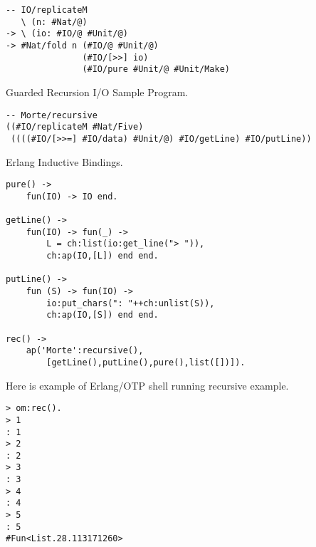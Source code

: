 \begin{lstlisting}[mathescape=true]
-- IO/replicateM
   \ (n: #Nat/@)
-> \ (io: #IO/@ #Unit/@)
-> #Nat/fold n (#IO/@ #Unit/@)
               (#IO/[>>] io)
               (#IO/pure #Unit/@ #Unit/Make)
\end{lstlisting}

Guarded Recursion I/O Sample Program.

\begin{lstlisting}[mathescape=true]
-- Morte/recursive
((#IO/replicateM #Nat/Five)
 ((((#IO/[>>=] #IO/data) #Unit/@) #IO/getLine) #IO/putLine))
\end{lstlisting}

Erlang Inductive Bindings.

\begin{lstlisting}[mathescape=true]
pure() ->
    fun(IO) -> IO end.

getLine() ->
    fun(IO) -> fun(_) ->
        L = ch:list(io:get_line("> ")),
        ch:ap(IO,[L]) end end.

putLine() ->
    fun (S) -> fun(IO) ->
        io:put_chars(": "++ch:unlist(S)),
        ch:ap(IO,[S]) end end.

rec() ->
    ap('Morte':recursive(),
        [getLine(),putLine(),pure(),list([])]).
\end{lstlisting}


Here is example of Erlang/OTP shell running recursive example.

\begin{lstlisting}[mathescape=true]
> om:rec().
> 1
: 1
> 2
: 2
> 3
: 3
> 4
: 4
> 5
: 5
#Fun<List.28.113171260>
\end{lstlisting}

